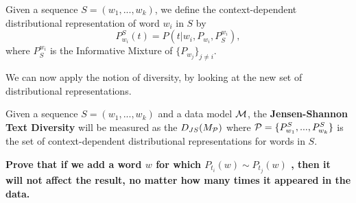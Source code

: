 \bed
Given a sequence $S=(w_1,...,w_k)$, we define the context-dependent
distributional representation of word $w_i$ in $S$ by 
\[P_{w_i}^S(t) = P(t|w_i,P_{w_i},P_S^{w_i}),\]
where $P_S^{w_i}$ is the Informative Mixture of $\{P_{w_j}\}_{j\neq i}$.
\eed

We can now apply the notion of diversity, by looking at the new
set of distributional representations.

\bed
Given a sequence $S=(w_1,...,w_k)$ and a data model ${\mathcal M}$, the
{\bf Jensen-Shannon Text Diversity} will be measured as the
$D_{JS}(M_{{\mathcal P}})$ where ${\mathcal P}=\{P_{w_1}^S,...,P_{w_k}^S\}$ is the set
of context-dependent distributional representations for words in $S$. 
\eed


{\bf Prove that if we add a word $w$ for which $P_{t_i}(w)\sim P_{t_j}(w)$ , then it will not affect the result, no matter how many times it appeared in the data.} 





